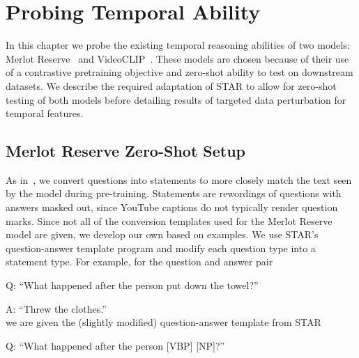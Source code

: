 
\chapter{Probing Temporal Ability}
\label{chap:probe}


In this chapter we probe the existing temporal reasoning abilities of two
models: Merlot Reserve~\citep{zellers2022mreserve} and
VideoCLIP~\citep{xu2021videoclip}.  These models are chosen because of their
use of a contrastive pretraining objective and zero-shot ability to test on
downstream datasets. We describe the required adaptation of STAR to allow for
zero-shot testing of both models before detailing results of targeted data
perturbation for temporal features.

\section{Merlot Reserve Zero-Shot Setup}
\label{sec:mres_zs}

As in~\citet{zellers2022mreserve}, we convert questions into statements to more
closely match the text seen by the model during pre-training. Statements are
rewordings of questions with answers masked out, since YouTube captions do not 
typically render question marks. Since not all of the conversion templates used
for the Merlot Reserve model are given, we develop our own based on examples. 
We use STAR's question-answer template program and modify each question type
into a statement type. For example, for the question and answer pair

Q: ``What happened after the person put down the towel?''

A: ``Threw the clothes.''\\
we are given the (slightly modified) question-answer template from STAR

Q: ``What happened after the person [VBP] [NP]?'' 

